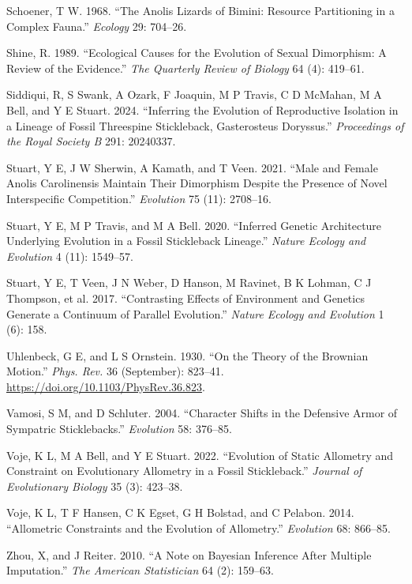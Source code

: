 \documentclass[
  12pt,
]{article}
\newlength{\cslhangindent}
\newlength{\cslentryspacingunit} %
\newenvironment{CSLReferences}[2] %
 {%
  \setlength{\parindent}{0pt}
  \ifodd #1
  \let\oldpar\par
  \def\par{\hangindent=\cslhangindent\oldpar}
  \fi
  \setlength{\parskip}{#2\cslentryspacingunit}
 }%
 {}
\begin{document}
\begin{CSLReferences}{1}{0}
\leavevmode{}%
Schoener, T W. 1968. {``The Anolis Lizards of Bimini: Resource
Partitioning in a Complex Fauna.''} \emph{Ecology} 29: 704--26.

\leavevmode{}%
Shine, R. 1989. {``Ecological Causes for the Evolution of Sexual
Dimorphism: A Review of the Evidence.''} \emph{The Quarterly Review of
Biology} 64 (4): 419--61.

\leavevmode{}%
Siddiqui, R, S Swank, A Ozark, F Joaquin, M P Travis, C D McMahan, M A
Bell, and Y E Stuart. 2024. {``Inferring the Evolution of Reproductive
Isolation in a Lineage of Fossil Threespine Stickleback, Gasterosteus
Doryssus.''} \emph{Proceedings of the Royal Society B} 291: 20240337.

\leavevmode{}%
Stuart, Y E, J W Sherwin, A Kamath, and T Veen. 2021. {``Male and Female
Anolis Carolinensis Maintain Their Dimorphism Despite the Presence of
Novel Interspecific Competition.''} \emph{Evolution} 75 (11): 2708--16.

\leavevmode{}%
Stuart, Y E, M P Travis, and M A Bell. 2020. {``Inferred Genetic
Architecture Underlying Evolution in a Fossil Stickleback Lineage.''}
\emph{Nature Ecology and Evolution} 4 (11): 1549--57.

\leavevmode{}%
Stuart, Y E, T Veen, J N Weber, D Hanson, M Ravinet, B K Lohman, C J
Thompson, et al. 2017. {``Contrasting Effects of Environment and
Genetics Generate a Continuum of Parallel Evolution.''} \emph{Nature
Ecology and Evolution} 1 (6): 158.

\leavevmode{}%
Uhlenbeck, G E, and L S Ornstein. 1930. {``On the Theory of the Brownian
Motion.''} \emph{Phys. Rev.} 36 (September): 823--41.
\url{https://doi.org/10.1103/PhysRev.36.823}.

\leavevmode{}%
Vamosi, S M, and D Schluter. 2004. {``Character Shifts in the Defensive
Armor of Sympatric Sticklebacks.''} \emph{Evolution} 58: 376--85.

\leavevmode{}%
Voje, K L, M A Bell, and Y E Stuart. 2022. {``Evolution of Static
Allometry and Constraint on Evolutionary Allometry in a Fossil
Stickleback.''} \emph{Journal of Evolutionary Biology} 35 (3): 423--38.

\leavevmode{}%
Voje, K L, T F Hansen, C K Egset, G H Bolstad, and C Pelabon. 2014.
{``Allometric Constraints and the Evolution of Allometry.''}
\emph{Evolution} 68: 866--85.

\leavevmode{}%
Zhou, X, and J Reiter. 2010. {``A Note on Bayesian Inference After
Multiple Imputation.''} \emph{The American Statistician} 64 (2):
159--63.

\end{CSLReferences}
\end{document}
